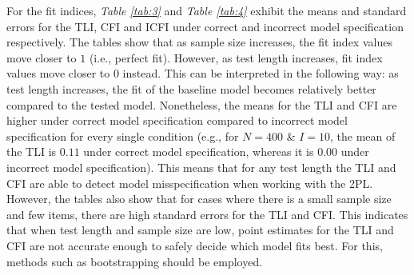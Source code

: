 \documentclass[Royal,sageapa,times,doublespace]{sagej}
\begin{document}
\indent For the fit indices, \textit{Table \ref{tab:3}} and \textit{Table \ref{tab:4}} exhibit the means and standard errors for the TLI, CFI and ICFI under correct and incorrect model specification respectively. The tables show that as sample size increases, the fit index values move closer to $1$ (i.e., perfect fit). However, as test length increases, fit index values move closer to $0$ instead. This can be interpreted in the following way: as test length increases, the fit of the baseline model becomes relatively better compared to the tested model. Nonetheless, the means for the TLI and CFI are higher under correct model specification compared to incorrect model specification for every single condition (e.g., for $N = 400$ \& $I = 10$, the mean of the TLI is $0.11$ under correct model specification, whereas it is $0.00$ under incorrect model specification). This means that for any test length the TLI and CFI are able to detect model misspecification when working with the 2PL. However, the tables also show that for cases where there is a small sample size and few items, there are high standard errors for the TLI and CFI. This indicates that when test length and sample size are low, point estimates for the TLI and CFI are not accurate enough to safely decide which model fits best. For this, methods such as bootstrapping should be employed. \\
\end{document}
